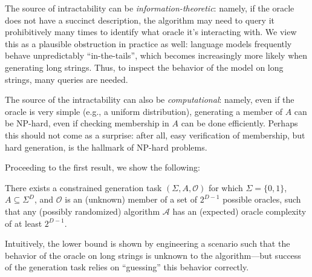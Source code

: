 The source of intractability can be \emph{information-theoretic}: namely, if the oracle does not have a succinct description, the algorithm may need to query it prohibitively many times to identify what oracle it's interacting with. We view this as a plausible obstruction in practice as well: language models frequently behave unpredictably ``in-the-tails'', which becomes increasingly more likely when generating long strings. Thus, to inspect the behavior of the model on long strings, many queries are needed. 

The source of the intractability can also be \emph{computational}: namely, even if the oracle is very simple (e.g., a uniform distribution), generating a member of $A$ can be NP-hard, even if checking membership in $A$ can be done efficiently. Perhaps this should not come as a surprise: after all, easy verification of membership, but hard generation, is the hallmark of NP-hard problems.     

Proceeding to the first result, we show the following: 

\begin{theorem} 
\label{thm:info_theoretical_lower_bound}
There exists a constrained generation task $(\Sigma, A, \mathcal{O})$ for which $\Sigma = \{0,1\}$, $A \subseteq \Sigma^D$, and $\mathcal{O}$ is an (unknown) member of a set of $2^{D-1}$ possible oracles, such that any (possibly randomized) algorithm $\mathcal{A}$ has an (expected) oracle complexity of at least $2^{D-1}$. 
\end{theorem}
Intuitively, the lower bound is shown by engineering a scenario such that the behavior of the oracle on long strings is unknown to the algorithm---but success of the generation task relies on ``guessing'' this behavior correctly.  

